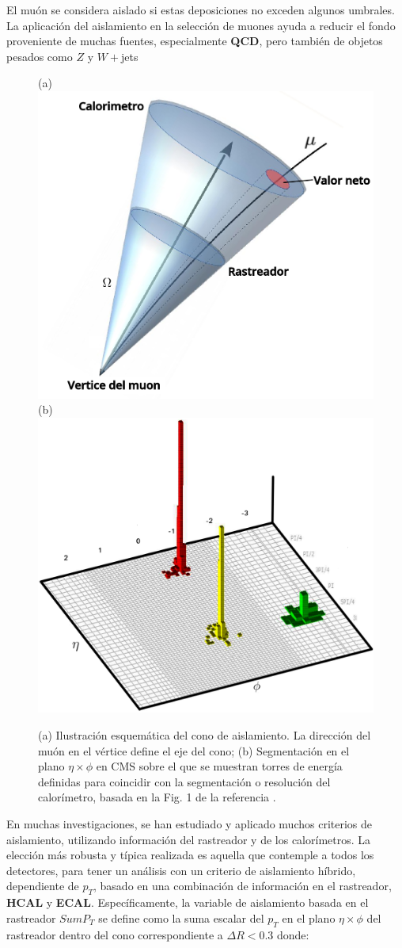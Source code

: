 El muón se considera aislado si estas deposiciones no exceden algunos umbrales. La aplicación del aislamiento en la selección de muones ayuda a reducir el fondo proveniente de muchas fuentes, especialmente \textbf{QCD}, pero también de objetos pesados como $Z$ y $W+$jets 
\begin{figure}[!t]
\centering
(a)
\includegraphics[width=.45\textwidth]{Analisis_y_Resultados/imagenes/cono_mu.png}
(b)
\includegraphics[width=.45\textwidth]{Analisis_y_Resultados/imagenes/plano.png}
\caption{(a) Ilustración esquemática del cono de aislamiento. La dirección del muón en el vértice define el eje del cono; (b) Segmentación en el plano $\eta \times\phi$ en CMS sobre el que se muestran torres de energía definidas para coincidir con la segmentación o resolución del calorímetro, basada en la Fig. 1 de la referencia \cite{tower_1}.}
\label{torre}
\end{figure}
En muchas investigaciones, se han estudiado y aplicado muchos criterios de aislamiento, utilizando información del rastreador y de los calorímetros. La elección más robusta y típica realizada es aquella que contemple a todos los detectores, para tener un análisis con un criterio de aislamiento híbrido, dependiente de $p_T$, basado en una combinación de información en el rastreador, \textbf{HCAL} y \textbf{ECAL}. Específicamente, la variable de aislamiento basada en el rastreador $SumP_T$ se define como la suma escalar del $p_T$ en el plano $\eta \times \phi$ del rastreador dentro del cono correspondiente a $\Delta R<0.3$ donde:
